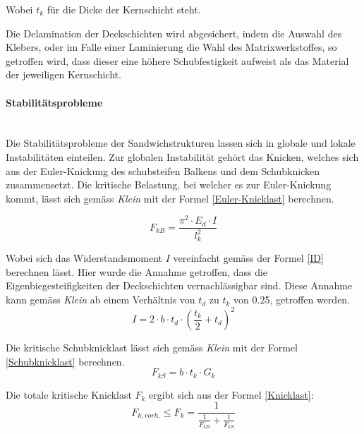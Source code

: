     Wobei $t_k$ für die Dicke der Kernschicht steht.

    Die Delamination der Deckschichten wird abgesichert, indem die Auswahl des Klebers, oder im Falle einer Laminierung die Wahl des Matrixwerkstoffes, so getroffen wird, dass dieser eine höhere Schubfestigkeit aufweist als das Material der jeweiligen Kernschicht.

    \paragraph{Stabilitätsprobleme}\mbox{}\\
    Die Stabilitätsprobleme der Sandwichstrukturen lassen sich in globale und lokale Instabilitäten einteilen. Zur globalen Instabilität gehört das Knicken, welches sich aus der Euler-Knickung des schubsteifen Balkens und dem Schubknicken zusammensetzt. Die kritische Belastung, bei welcher es zur Euler-Knickung kommt, lässt sich gemäss \emph{Klein} \cite{klein} mit der Formel \ref{Euler-Knicklast} berechnen.

    \begin{equation}
      \label{Euler-Knicklast}
      F_{kB}=\frac{\pi^2 \cdot E_d \cdot I}{l_k^{2}}
    \end{equation}

    Wobei sich das Widerstandsmoment $I$ vereinfacht gemäss der Formel \ref{ID} berechnen lässt. Hier wurde die Annahme getroffen, dass die Eigenbiegesteifigkeiten der Deckschichten vernachlässigbar sind. Diese Annahme kann gemäss \emph{Klein} ab einem Verhältnis von $t_d$ zu $t_k$ von 0.25, getroffen werden.
    \begin{equation}
      \label{ID}
      I= 2 \cdot b \cdot t_d \cdot \left( \frac{t_k}{2} + t_d \right )^{2}
    \end{equation}

    Die kritische Schubknicklast lässt sich gemäss \emph{Klein} mit der Formel \ref{Schubknicklast} berechnen.
    \begin{equation}
      \label{Schubknicklast}
      F_{kS} = b \cdot t_k \cdot G_k
    \end{equation}

    Die totale kritische Knicklast \(F_k\) ergibt sich aus der Formel \ref{Knicklast}:
    \begin{equation}
      \label{Knicklast}
      F_{k, vorh.} \leq F_k=\frac{1}{\frac{1}{F_{kB}}+\frac{1}{F_{kS}}}
    \end{equation}


